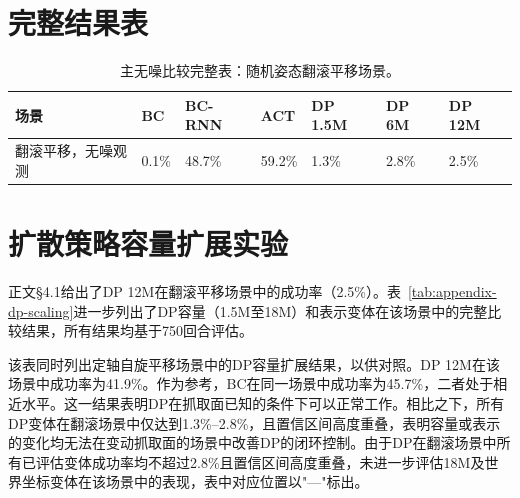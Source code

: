 \section{完整结果表}

\begin{table}[!htbp]
    \caption{主无噪比较完整表：随机姿态翻滚平移场景。}
    \label{tab:appendix-main-clean}
    \centering
    \small
    \renewcommand{\arraystretch}{1.12}
    \begin{tabularx}{\textwidth}{>{\raggedright\arraybackslash}p{}ZZZZZZ}
        \hline
        场景 & BC & BC-RNN & ACT & DP 1.5M & DP 6M & DP 12M \\
        \hline
        翻滚平移，无噪观测 & 0.1\% & 48.7\% & 59.2\% & 1.3\% & 2.8\% & 2.5\% \\
        \hline
    \end{tabularx}
\end{table}


\section{扩散策略容量扩展实验}\label{sec:appendix-dp}

正文§4.1给出了DP 12M在翻滚平移场景中的成功率（2.5\%）。表~\ref{tab:appendix-dp-scaling}进一步列出了DP容量（1.5M至18M）和表示变体在该场景中的完整比较结果，所有结果均基于750回合评估。

该表同时列出定轴自旋平移场景中的DP容量扩展结果，以供对照。DP 12M在该场景中成功率为41.9\%。作为参考，BC在同一场景中成功率为45.7\%，二者处于相近水平。这一结果表明DP在抓取面已知的条件下可以正常工作。相比之下，所有DP变体在翻滚场景中仅达到1.3\%--2.8\%，且置信区间高度重叠，表明容量或表示的变化均无法在变动抓取面的场景中改善DP的闭环控制。由于DP在翻滚场景中所有已评估变体成功率均不超过2.8\%且置信区间高度重叠，未进一步评估18M及世界坐标变体在该场景中的表现，表中对应位置以"—"标出。

